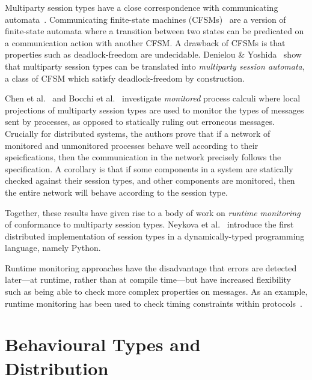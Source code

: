 \documentclass[
graybox,
envcountchap
]{svmult}
\begin{document}
\begin{bibunit}

  Multiparty session types have a close correspondence with communicating
  automata~\cite{DenielouY12:mpst-automata}. Communicating finite-state
  machines (CFSMs)~\cite{BrandZ83:cfsms} are a version of finite-state automata
  where a transition between two states can be predicated on a communication
  action with another CFSM. A drawback of CFSMs is that properties such as
  deadlock-freedom are undecidable. Denielou \&
  Yoshida~\cite{DenielouY12:mpst-automata} show that multiparty session types
  can be translated into \emph{multiparty session automata}, a class of CFSM
  which satisfy deadlock-freedom by construction.

  Chen et al.~\cite{ChenBDHY11:monitoring} and Bocchi et
  al.~\cite{BocchiCDHY13:monitoring} investigate \emph{monitored} process
  calculi where local projections of multiparty session types are used to
  monitor the types of messages sent by processes, as opposed to statically
  ruling out erroneous messages. Crucially for distributed systems,
  the authors prove that if a network of monitored and unmonitored processes
  behave well according to their speicfications, then the communication in the
  network precisely follows the specification. A corollary is that if some
  components in a system are statically checked against their session types, and
  other components are monitored, then the entire network will behave according
  to the session type.

  Together, these results have given rise to a body of work on \emph{runtime
  monitoring} of conformance to multiparty session types. Neykova et
  al.~\cite{NeykovaYH13:spy} introduce the first distributed implementation of
  session types in a dynamically-typed programming language, namely Python.

  Runtime monitoring approaches have the disadvantage that errors are detected
  later---at runtime, rather than at compile time---but have increased
  flexibility such as being able to check more complex properties on messages.
  As an example, runtime monitoring has been used to check timing
  constraints within protocols~\cite{NeykovaBY17:timed-monitoring}.


  \section{Behavioural Types and Distribution}\label{sec:bt:distrib}


\end{bibunit}
\end{document}
